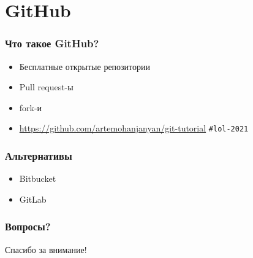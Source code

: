 \documentclass[pdf,russian]{beamer}
\begin{document}
\section{GitHub}

\begin{frame}
    \frametitle{Что такое GitHub?}
    \begin{itemize}
        \pause
        \item Бесплатные открытые репозитории
        \pause
        \item Pull request-ы
        \pause
        \item fork-и
        \pause
        \item \url{https://github.com/artemohanjanyan/git-tutorial}
            \pause\texttt{\#{}lol-2021}
    \end{itemize}
\end{frame}

\begin{frame}
    \frametitle{Альтернативы}
    \begin{itemize}
        \pause
        \item Bitbucket
        \pause
        \item GitLab
    \end{itemize}
\end{frame}

\begin{frame}
    \frametitle{Вопросы?}
    \pause
    Спасибо за внимание!
\end{frame}
\end{document}
